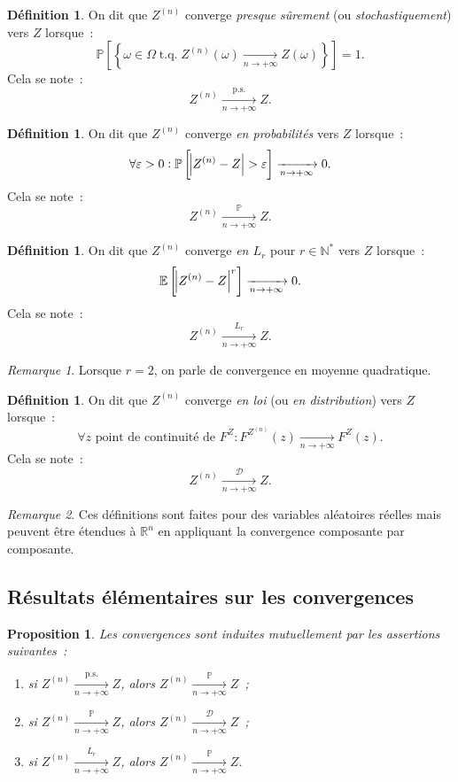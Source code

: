 \documentclass{report}
\DeclareMathOperator{\tq}{\text{ t.q. }}
\renewcommand{\P}{\mathbb P}
\newcommand{\E}{\mathbb E}
\newcommand{\pinfty}{{+\infty}}
\newcommand{\cvgp}{\xrightarrow[n \to \pinfty]{\P}}
\newcommand{\cvgLr}{\xrightarrow[n \to \pinfty]{L_r}}
\newcommand{\cvgd}{\xrightarrow[n \to \pinfty]{\mathcal D}}
\newcommand{\ps}{{\text{p.s.}}}
\newcommand{\cvgps}{\xrightarrow[n \to \pinfty]\ps}
\newcommand{\N}{\mathbb N}
\newcommand{\R}{\mathbb R}
\newtheorem{prp}[thm]{Proposition}
\theoremstyle{definition}
\newtheorem{déf}[thm]{Définition}
\theoremstyle{remark}
\newtheorem*{rmq}{Remarque}
\begin{document}
			\begin{déf} On dit que $Z^{(n)}$ converge \textit{presque sûrement} (ou \textit{stochastiquement}) vers $Z$ lorsque~:
			\[\P\left[\left\{\omega \in \Omega \tq Z^{(n)}(\omega) \xrightarrow[n \to \pinfty]{} Z(\omega)\right\}\right] = 1.\]
			Cela se note~:
			\[Z^{(n)} \cvgps Z.\]
			\end{déf}

			\begin{déf} On dit que $Z^{(n)}$ converge \textit{en probabilités} vers $Z$ lorsque~:
			\[\forall \varepsilon > 0 : \P\left[\abs {Z^{(n)} - Z} > \varepsilon\right] \xrightarrow[n \to \pinfty]{} 0.\]
			Cela se note~:
			\[Z^{(n)} \cvgp Z.\]
			\end{déf}

			\begin{déf} On dit que $Z^{(n)}$ converge \textit{en $L_r$} pour $r \in \N^*$ vers $Z$ lorsque~:
			\[\E\left[\abs {Z^{(n)} - Z}^r\right] \xrightarrow[n \to \pinfty]{} 0.\]
			Cela se note~:
			\[Z^{(n)} \cvgLr Z.\]
			\end{déf}

			\begin{rmq} Lorsque $r=2$, on parle de convergence en moyenne quadratique.
			\end{rmq}

			\begin{déf} On dit que $Z^{(n)}$ converge \textit{en loi} (ou \textit{en distribution}) vers $Z$ lorsque~:
			\[\forall z \text{ point de continuité de }F^Z : F^{Z^{(n)}}(z) \xrightarrow[n \to \pinfty]{} F^Z(z).\]
			Cela se note~:
			\[Z^{(n)} \cvgd Z.\]
			\end{déf}

			\begin{rmq} Ces définitions sont faites pour des variables aléatoires réelles mais peuvent être étendues à $\R^n$ en appliquant la convergence composante
			par composante.
			\end{rmq}

		\subsection{Résultats élémentaires sur les convergences}
			\begin{prp} Les convergences sont induites mutuellement par les assertions suivantes~:
			\begin{enumerate}
				\item si $Z^{(n)} \cvgps Z$, alors $Z^{(n)} \cvgp Z$~;
				\item si $Z^{(n)} \cvgp Z$, alors $Z^{(n)} \cvgd Z$~;
				\item si $Z^{(n)} \cvgLr Z$, alors $Z^{(n)} \cvgp Z$.
			\end{enumerate}
			\end{prp}
\end{document}
